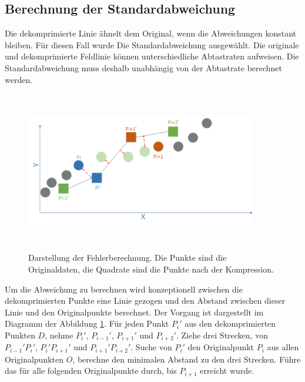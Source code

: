 \subsection{Berechnung der Standardabweichung}\label{testsetup:ablauf}
Die dekomprimierte Linie ähnelt dem Original, wenn die Abweichungen konstant bleiben. Für diesen Fall wurde Die Standardabweichung ausgewählt. Die originale und dekomprimierte Feldlinie können unterschiedliche Abtastraten aufweisen. Die Standardabweichung muss deshalb unabhängig von der Abtastrate berechnet werden.

\begin{figure}[!htbp]
	\center
	\includegraphics[width=0.9\textwidth,height=7cm,keepaspectratio]{./pictures/testsetup/errorcalc.png}
	\caption{Darstellung der Fehlerberechnung. Die Punkte sind die Originaldaten, die Quadrate sind die Punkte nach der Kompression.}
	\label{testsetup:ablauf:fehlerberechnung:diagramm}
\end{figure} 
Um die Abweichung zu berechnen wird konzeptionell zwischen die dekomprimierten Punkte eine Linie gezogen und den Abstand zwischen dieser Linie und den Originalpunkte berechnet. Der Vorgang ist dargestellt im Diagramm der Abbildung \ref{testsetup:ablauf:fehlerberechnung:diagramm}. Für jeden Punkt $P_i'$ aus den dekomprimierten Punkten $D$, nehme $P_i'$, $P_{i-1}'$, $P_{i+1}'$ und $P_{i+2}'$. Ziehe drei Strecken, von $P_{i-1}'P_i'$, $P_{i}'P_{i+1}'$ und $P_{i+1}'P_{i+2}'$. Suche von $P_i'$ den Originalpunkt $P_i$ aus allen Originalpunkten $O$, berechne den minimalen Abstand zu den drei Strecken. Führe das für alle folgenden Originalpunkte durch, bis $P_{i+1}$ erreicht wurde.

